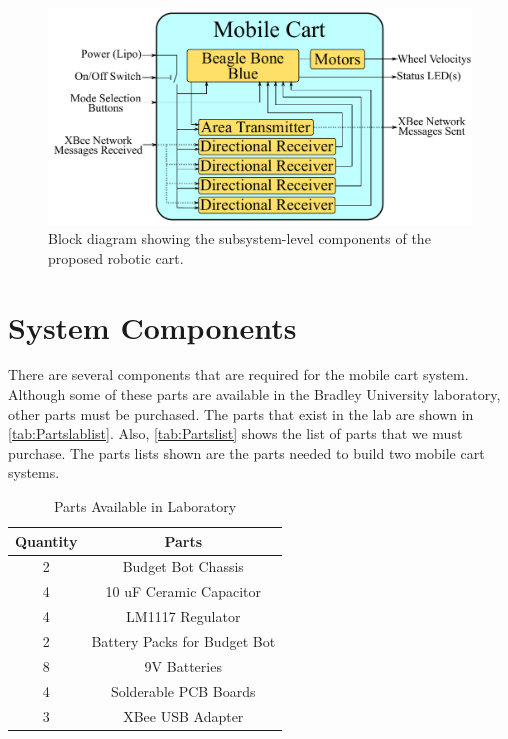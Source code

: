 \begin{figure}[h!]
  \centering
  \includegraphics[scale=0.82]{figs/mobile_cart_block_diagram}
  \caption{Block diagram showing the subsystem-level components of the proposed robotic cart.}
  \label{fig:mobile_block_diag}
\end{figure}


\section{System Components}
There are several components that are required for the mobile cart system. Although some of these parts are available in the Bradley University laboratory, other parts must be purchased. The parts that exist in the lab are shown in \autoref{tab:Partslablist}. Also, \autoref{tab:Partslist} shows the list of parts that we must purchase. The parts lists shown are the parts needed to build two mobile cart systems.

\begin{table}[h!]
  \centering
  \begin{tabular}{c|c}
      \toprule
      \textbf{Quantity} & \textbf{Parts}\\
      \toprule
      2 & Budget Bot Chassis\\
      4 & 10 uF Ceramic Capacitor\\
      4 & LM1117 Regulator\\
      2 & Battery Packs for Budget Bot\\
      8 & 9V Batteries\\
      4 & Solderable PCB Boards\\
      3 & XBee USB Adapter\\
      \bottomrule
  \end{tabular}
  \caption{Parts Available in Laboratory}
  \label{tab:Partslablist}
\end{table}

